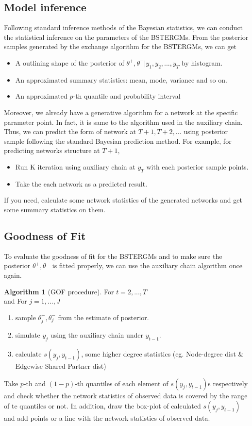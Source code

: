 \documentclass[aspectratio=169,ignorenonframetext,9pt]{beamer}
\theoremstyle{plain}
\theoremstyle{definition}
\newtheorem{algo}{Algorithm}[section]
\begin{document}
\subsection{Model inference}

Following standard inference methods of the Bayesian statistics,
we can conduct the statistical inference on the parameters of the BSTERGMs.
From the posterior samples generated by the exchange algorithm for the BSTERGMs, we can get
\begin{itemize}
    \item A outlining shape of the posterior of $\theta^+,\theta^-|y_1,y_2,...,y_T$ by histogram.
    \item An approximated summary statistics: mean, mode, variance and so on.
    \item An approximated $p$-th quantile and probability interval
\end{itemize}

Moreover, we already have a generative algorithm for a network at the specific parameter point.
In fact, it is same to the algorithm used in the auxiliary chain.
Thus, we can predict the form of network at $T+1,T+2,...$ using posterior sample following the standard Bayesian prediction method.
For example, for predicting networks structure at $T+1$,
\begin{itemize}
    \item Run K iteration using auxiliary chain at $y_T$ with each posterior sample points.
    \item Take the each network as a predicted result.
\end{itemize}
If you need, calculate some network statistics of the generated networks and get some summary statistics on them.


\subsection{Goodness of Fit}
To evaluate the goodness of fit for the BSTERGMs and to make sure the posterior $\theta^+,\theta^-$ is fitted properly,
we can use the auxiliary chain algorithm once again.
\begin{algo}[GOF procedure]
    For $t=2,...,T$ \\
    and For $j=1,...,J$
    \begin{enumerate}
        \item sample $\theta_j^+,\theta_j^-$ from the estimate of posterior.
        \item simulate $y_j$ using the auxiliary chain under $y_{t-1}$.
        \item calculate $s(y_j, y_{t-1})$, some higher degree statistics (eg. Node-degree dist \& Edgewise Shared Partner dist)
    \end{enumerate}
    Take $p$-th and $(1-p)$-th quantiles of each element of $s(y_j, y_{t-1})$s respectively and check 
    whether the network statistics of observed data is covered by the range of te quantiles or not.
    In addition, draw the box-plot of calculated $s(y_j, y_{t-1})$ and add points or a line with the network statistics of observed data.
\end{algo}
\end{document}

